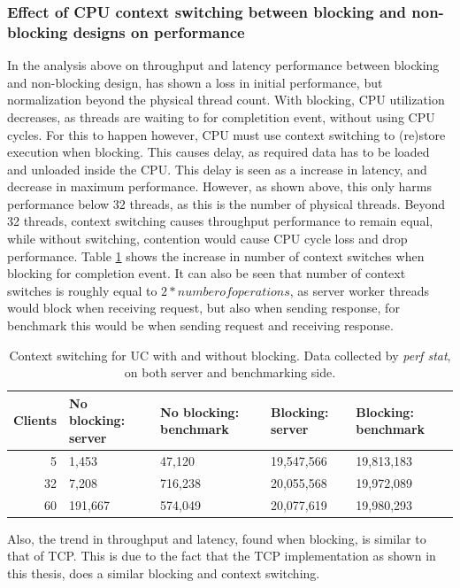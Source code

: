 \subsubsection{Effect of CPU context switching between blocking and non-blocking designs on performance}
In the analysis above on throughput and latency performance between blocking and non-blocking design, has shown a loss in initial performance, but normalization beyond the physical thread count.
With blocking, CPU utilization decreases, as threads are waiting to for completition event, without using CPU cycles.
For this to happen however, CPU must use context switching to (re)store execution when blocking.
This causes delay, as required data has to be loaded and unloaded inside the CPU.
This delay is seen as a increase in latency, and decrease in maximum performance.
However, as shown above, this only harms performance below 32 threads, as this is the number of physical threads.
Beyond 32 threads, context switching causes throughput performance to remain equal, while without switching, contention would cause CPU cycle loss and drop performance.
Table \ref{tab:context} shows the increase in number of context switches when blocking for completion event.
It can also be seen that number of context switches is roughly equal to $2*number of operations$, as server worker threads would block when receiving request, but also when sending response, for benchmark this would be when sending request and receiving response.
\begin{table}
    \centering
    \begin{tabular}{r p{3cm} p{3cm} p{3cm} p{3cm}}
        \toprule
        \textbf{Clients} & \textbf{No blocking: server} & \textbf{No blocking: benchmark} & \textbf{Blocking: server} & \textbf{Blocking: benchmark} \\
        \midrule
        5 & 1,453 & 47,120 & 19,547,566 & 19,813,183 \\
        32 & 7,208 & 716,238 & 20,055,568 & 19,972,089 \\
        60 & 191,667 & 574,049 & 20,077,619 & 19,980,293 \\
        \bottomrule
    \end{tabular}
    \caption[Context switching for UC with and without blocking.]{Context switching for UC with and without blocking. Data collected by \textit{perf stat}, on both server and benchmarking side.}
    \label{tab:context}
\end{table}


Also, the trend in throughput and latency, found when blocking, is similar to that of TCP.
This is due to the fact that the TCP implementation as shown in this thesis, does a similar blocking and context switching.



